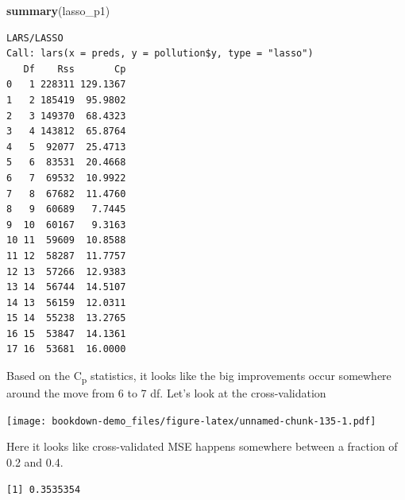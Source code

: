 \documentclass[]{book}
\newenvironment{Shaded}{\begin{snugshade}}{\end{snugshade}}
\newcommand{\KeywordTok}[1]{\textcolor[rgb]{0.13,0.29,0.53}{\textbf{#1}}}
\newcommand{\DataTypeTok}[1]{\textcolor[rgb]{0.13,0.29,0.53}{#1}}
\newcommand{\DecValTok}[1]{\textcolor[rgb]{0.00,0.00,0.81}{#1}}
\newcommand{\StringTok}[1]{\textcolor[rgb]{0.31,0.60,0.02}{#1}}
\newcommand{\OperatorTok}[1]{\textcolor[rgb]{0.81,0.36,0.00}{\textbf{#1}}}
\newcommand{\NormalTok}[1]{#1}
\theoremstyle{definition}
\theoremstyle{definition}
\theoremstyle{definition}
\theoremstyle{remark}
\begin{document}
\begin{Shaded}
\begin{Highlighting}[]
\KeywordTok{summary}\NormalTok{(lasso_p1)}
\end{Highlighting}
\end{Shaded}

\begin{verbatim}
LARS/LASSO
Call: lars(x = preds, y = pollution$y, type = "lasso")
   Df    Rss       Cp
0   1 228311 129.1367
1   2 185419  95.9802
2   3 149370  68.4323
3   4 143812  65.8764
4   5  92077  25.4713
5   6  83531  20.4668
6   7  69532  10.9922
7   8  67682  11.4760
8   9  60689   7.7445
9  10  60167   9.3163
10 11  59609  10.8588
11 12  58287  11.7757
12 13  57266  12.9383
13 14  56744  14.5107
14 13  56159  12.0311
15 14  55238  13.2765
16 15  53847  14.1361
17 16  53681  16.0000
\end{verbatim}

Based on the C\textsubscript{p} statistics, it looks like the big
improvements occur somewhere around the move from 6 to 7 df. Let's look
at the cross-validation

\begin{Shaded}
\end{Shaded}

\texttt{[image: bookdown-demo\_files/figure-latex/unnamed-chunk-135-1.pdf]}

Here it looks like cross-validated MSE happens somewhere between a
fraction of 0.2 and 0.4.

\begin{Shaded}
\end{Shaded}

\begin{verbatim}
[1] 0.3535354
\end{verbatim}

\begin{Shaded}
\end{Shaded}
\end{document}
